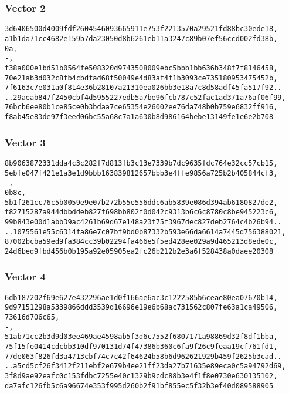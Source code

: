 \documentclass[
]{article}
\begin{document}
\hypertarget{vector-2}{%
\subsubsection{Vector 2}\label{vector-2}}

\begin{verbatim}
3d6406500d4009fdf2604546093665911e753f2213570a29521fd88bc30ede18,
a1b1da71cc4682e159b7da23050d8b6261eb11a3247c89b07ef56ccd002fd38b,
0a,
-,
f38a000e1bd51b0564fe508320d9743508009ebc5bbb1bb636b348f7f8146458,
70e21ab3d032c8fb4cbdfad68f50049e4d83af4f1b3093ce735180953475452b,
7f6163c7e031a0f814e36b28107a21310ea026bb3e18a7c8d58adf45fa517f92..
..29aeab847f2450cbf4d5955227edb5a7be96fcb787c52fac1ad371a76af06f99,
76bcb6ee80b1ce85ce0b3bdaa7ce65354e26002ee76da748b0b759e6832ff916,
f8ab45e83de97f3eed06bc55a68c7a1a630b8d986164bebe13149fe1e6e2b708
\end{verbatim}

\hypertarget{vector-3}{%
\subsubsection{Vector 3}\label{vector-3}}

\begin{verbatim}
8b9063872331dda4c3c282f7d813fb3c13e7339b7dc9635fdc764e32cc57cb15,
5ebfe047f421e1a3e1d9bbb163839812657bbb3e4ffe9856a725b2b405844cf3,
-,
0b8c,
5b1f261cc76c5b0059e9e07b272b55e556ddc6ab5839e086d394ab6180827de2,
f82715287a944dbbddeb827f698bb802f0d042c9313b6c6c8780c8be945223c6,
99b843e00d1abb39ac4261b69d67e148a23f75f3967dec827deb2764c4b26b94..
..1075561e55c6314fa86e7c07bf9bd0b87332b593e66da6614a7445d756388021,
87002bcba59ed9fa384cc39b02294fa466e5f5ed428ee029a9d465213d8ede0c,
24d6bed9fbd456b0b195a92e05905ea2fc26b212b2e3a6f528438a0daee20308
\end{verbatim}

\hypertarget{vector-4}{%
\subsubsection{Vector 4}\label{vector-4}}

\begin{verbatim}
6db187202f69e627e432296ae1d0f166ae6ac3c1222585b6ceae80ea07670b14,
9d97151298a5339866ddd3539d16696e19e6b68ac731562c807fe63a1ca49506,
73616d706c65,
-,
51ab71cc2b3d9d03ee469ae4598ab5f3d6c7552f6807171a98869d32f8df1bba,
75f15fe0414cdcbb310df970131d74f47386b360c6fa9f26c9feaa19cf761fd1,
77de063f826fd3a4713cbf74c7c42f64624b58b6d962621929b459f2625b3cad..
..a5cd5cf26f3412f211ebf2e679b4ee21ff23da27b71635e89eca0c5a94792d69,
3f8d9ae92eafc0c153fdbc7255e40c1329b9cdc88b3e4f1f8e0730e630135102,
da7afc126fb5c6a96674e353f995d260b2f91bf855ec5f32b3ef40d089588905
\end{verbatim}
\end{document}
